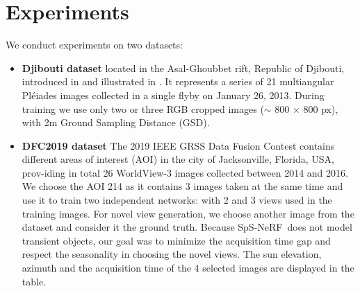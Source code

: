 \documentclass{isprs} %
\newcommand{\OurNeRFShort}{{SpS-NeRF}}
\newcommand{\zll}[1]{\textcolor{red}{#1}} %
\begin{document}
\section{Experiments}
We conduct experiments on two datasets:
\begin{itemize}
    \item \textbf{Djibouti dataset} located in the Asal-Ghoubbet rift, Republic of Djibouti, introduced in \cite{labarre2019retrieving} and illustrated in . It represents a series of 21 multiangular Pléiades images collected in a single ﬂyby on January 26, 2013. During training we use only two or three RGB cropped images ($\sim$ 800 $\times$ 800 px), with 2m Ground Sampling Distance (GSD). %
    \item  \textbf{DFC2019 dataset} The 2019 IEEE GRSS Data Fusion Contest \cite{le20192019} contains different areas of interest (AOI) in the city of Jacksonville, Florida, USA, prov-iding in total 26 WorldView-3 images collected between 2014 and 2016. We choose the AOI 214 as it contains 3 images taken at the same time and use it to train two independent networks: with 2 and 3 views used in the training images. For novel view generation, we choose another image from the dataset and consider it the ground truth. Because \OurNeRFShort~does not model transient objects, our goal was to minimize the acquisition time gap and respect the seasonality in choosing the novel views. The sun elevation, azimuth and the acquisition time of the 4 selected images are displayed in the table. %
\end{itemize}
\end{document}
